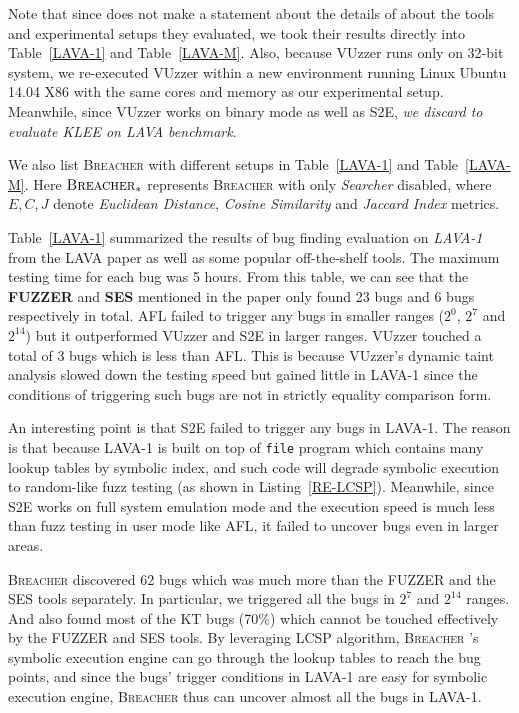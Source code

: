 \documentclass{cta-author}
\newcommand{\prototype}{\textsc{Breacher} }
\begin{document}
Note that since \cite{dolan2016lava} does not make a statement about the details of 
about the tools and experimental setups they evaluated, we took their results
directly into Table~\ref{LAVA-1} and Table~\ref{LAVA-M}. 
Also, because VUzzer runs only on 32-bit system, 
we re-executed VUzzer within a new environment running Linux Ubuntu 14.04 X86 
with the same cores and memory as our experimental setup. Meanwhile, since VUzzer
works on binary mode as well as S2E, \emph{we discard to evaluate KLEE on LAVA benchmark}.

We also list \prototype with different setups in Table~\ref{LAVA-1} and Table~\ref{LAVA-M}. 
Here $\prototype_{*}$ represents \prototype with only \textit{Searcher} disabled, 
where $E,C,J$ denote \textit{Euclidean Distance}, \textit{Cosine Similarity} 
and \textit{Jaccard Index} metrics.

Table~\ref{LAVA-1} summarized the results of bug finding evaluation on 
\textit{LAVA-1} from the LAVA paper as well as some popular off-the-shelf 
tools. The maximum testing time for each bug was 5 hours. 
From this table, we can see that the \textbf{FUZZER} and \textbf{SES} 
mentioned in the paper only found 23 bugs and 6 bugs respectively in total. 
AFL failed to trigger any bugs in smaller ranges ($2^0$, $2^7$ and $2^{14}$) 
but it outperformed VUzzer and S2E in larger ranges. 
VUzzer touched a total of 3 bugs which is less than AFL. 
This is because VUzzer's dynamic taint analysis slowed down
the testing speed but gained little in LAVA-1 since the conditions of triggering
such bugs are not in strictly equality comparison form.

An interesting point is that S2E failed to trigger any bugs in LAVA-1. The reason
is that because LAVA-1 is built on top of \texttt{file} program which contains many
lookup tables by symbolic index, and such code will degrade symbolic execution
to random-like fuzz testing (as shown in Listing~\ref{RE-LCSP}). Meanwhile, 
since S2E works on full system emulation mode and the execution speed is much less 
than fuzz testing in user mode like AFL, it failed to uncover bugs even in larger areas.

\prototype discovered 62 bugs which was much more than the FUZZER and the 
SES tools separately. In particular, we triggered all the bugs in $2^7$ and 
$2^{14}$ ranges. And also found most of the KT bugs (70\%) which cannot be 
touched effectively by the FUZZER and SES tools. By leveraging LCSP algorithm,
\prototype's symbolic execution engine can go through the lookup tables to reach
the bug points, and since the bugs' trigger conditions in LAVA-1 are easy for 
symbolic execution engine, \prototype thus can uncover almost all the bugs in LAVA-1.
\end{document}
